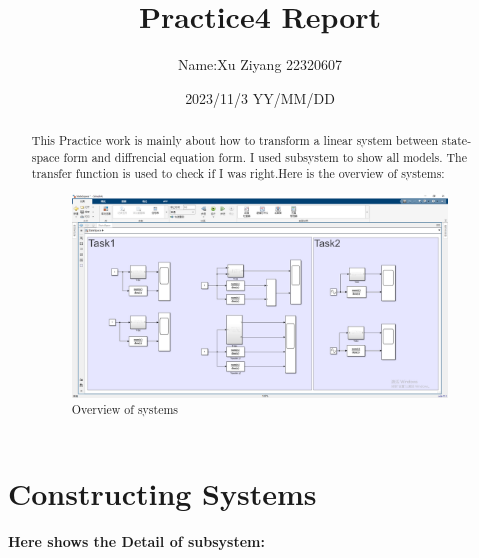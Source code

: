 \documentclass[12pt,a4paper,oneside]{ctexart}
\title{\textbf{Practice4 Report}}
\author{Name:Xu Ziyang 22320607}
\date{2023/11/3 YY/MM/DD}
\begin{document}
    \maketitle
    \newpage
    \begin{abstract}
        This Practice work is mainly about how to transform a linear system between state-space form and diffrencial equation form.
        I used subsystem to show all models. The transfer function is used to check if I was right.Here is the overview of systems:
        \begin{figure}[H]
            \includegraphics[width = 0.9\linewidth]{../screenshots/MOverView}
            \caption{Overview of systems}
        \end{figure}
    \end{abstract}

    \section{Constructing Systems}
    \textbf{Here shows the Detail of subsystem:}
\end{document}

